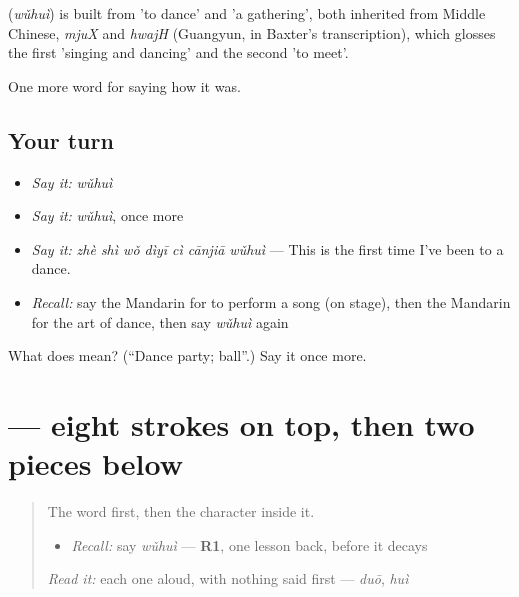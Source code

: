 \begin{cousinweb}
\textbf{} (\emph{wǔhuì}) is built from  'to dance' and  'a gathering', both inherited from Middle Chinese, \emph{mjuX} and \emph{hwajH} (Guangyun, in Baxter's transcription), which glosses the first 'singing and dancing' and the second 'to meet'.
\end{cousinweb}

\begin{grammarlens}[title={What you've built}]
One more word for saying how it was.
\end{grammarlens}

\subsection*{Your turn}
\begin{itemize}
\raggedright
  \item \emph{Say it:} \emph{wǔhuì}
  \item \emph{Say it:} \emph{wǔhuì}, once more
  \item \emph{Say it:} \emph{zhè shì wǒ dìyī cì cānjiā wǔhuì} — This is the first time I've been to a dance.
  \item \emph{Recall:} say the Mandarin for to perform a song (on stage), then the Mandarin for the art of dance, then say \emph{wǔhuì} again
\end{itemize}

\begin{tcolorbox}[breakable,colback=teal!4,colframe=teal!35!black,title={Before you move on}]
What does  mean? (\textquotedblleft{}Dance party; ball\textquotedblright{}.) Say it once more.
\end{tcolorbox}
\section[\texorpdfstring{\zh{舞} (wǔ)}{舞 (wǔ)}]{ — eight strokes on top, then two pieces below}

\label{lesson:ZH-W505-wu-dance}



\begin{quote}
The word first, then the character inside it.

\begin{itemize}
\raggedright
  \item \emph{Recall:} say \emph{wǔhuì} — \textbf{R1}, one lesson back, before it decays
\end{itemize}

\begin{quote}
 
\end{quote}

\emph{Read it:} each one aloud, with nothing said first — \emph{duō}, \emph{huì}
\end{quote}

